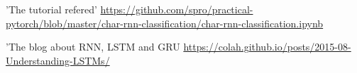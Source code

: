 \documentclass[runningheads]{llncs}
\begin{document}




\begin{thebibliography}{9}

	'The tutorial refered'
	\url{https://github.com/spro/practical-pytorch/blob/master/char-rnn-classification/char-rnn-classification.ipynb}

'The blog about RNN, LSTM and GRU
\url{https://colah.github.io/posts/2015-08-Understanding-LSTMs/}


\end{thebibliography}
\end{document}
